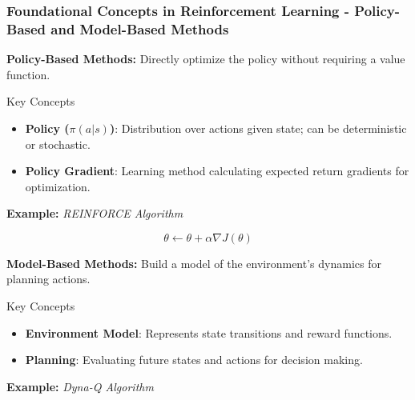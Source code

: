 \documentclass[aspectratio=169]{beamer}
\begin{document}
\begin{frame}[fragile]
    \frametitle{Foundational Concepts in Reinforcement Learning - Policy-Based and Model-Based Methods}
    \textbf{Policy-Based Methods:} Directly optimize the policy without requiring a value function.
    
    \begin{block}{Key Concepts}
        \begin{itemize}
            \item \textbf{Policy ($\pi(a|s)$)}: Distribution over actions given state; can be deterministic or stochastic.
            \item \textbf{Policy Gradient}: Learning method calculating expected return gradients for optimization.
        \end{itemize}
    \end{block}
    
    \textbf{Example:} \textit{REINFORCE Algorithm}
    
    \begin{equation}
    \theta \leftarrow \theta + \alpha \nabla J(\theta) 
    \end{equation}
    
    \bigskip

    \textbf{Model-Based Methods:} Build a model of the environment's dynamics for planning actions.
    
    \begin{block}{Key Concepts}
        \begin{itemize}
            \item \textbf{Environment Model}: Represents state transitions and reward functions.
            \item \textbf{Planning}: Evaluating future states and actions for decision making.
        \end{itemize}
    \end{block}
    
    \textbf{Example:} \textit{Dyna-Q Algorithm}
\end{frame}
\end{document}
